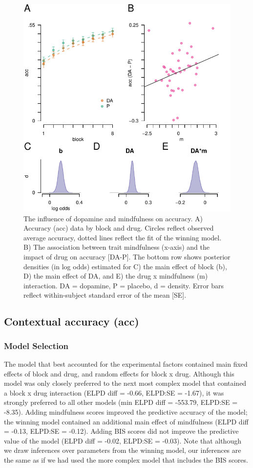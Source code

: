 \documentclass{article}
\begin{document}
\begin{figure}

{\centering \includegraphics[width=0.7\linewidth]{../../images/acc_fig} 

}

\caption{The influence of dopamine and mindfulness on accuracy. A) Accuracy (acc) data by block and drug. Circles reflect observed average accuracy, dotted lines reflect the fit of the winning model. B) The association between trait mindfulness (x-axis) and the impact of drug on accuracy [DA-P]. The bottom row shows posterior densities (in log odds) estimated for C) the main effect of block (b), D) the main effect of DA, and E) the drug x mindfulness (m) interaction. DA = dopamine, P = placebo, d = density. Error bars reflect within-subject standard error of the mean [SE].}\label{fig:accfig}
\end{figure}

\hypertarget{contextual-accuracy-acc}{%
\subsection{Contextual accuracy (acc)}\label{contextual-accuracy-acc}}

\hypertarget{model-selection-1}{%
\subsubsection{Model Selection}\label{model-selection-1}}

The model that best accounted for the experimental factors contained
main fixed effects of block and drug, and random effects for block x
drug. Although this model was only closely preferred to the next most
complex model that contained a block x drug interaction (ELPD diff =
-0.66, ELPD:SE = -1.67), it was strongly preferred to all other models
(min ELPD diff = -553.79, ELPD:SE = -8.35). Adding mindfulness scores
improved the predictive accuracy of the model; the winning model
contained an additional main effect of mindfulness (ELPD diff = -0.13,
ELPD:SE = -0.12). Adding BIS scores did not improve the predictive value
of the model (ELPD diff = -0.02, ELPD:SE = -0.03). Note that although we
draw inferences over parameters from the winning model, our inferences
are the same as if we had used the more complex model that includes the
BIS scores.
\end{document}
